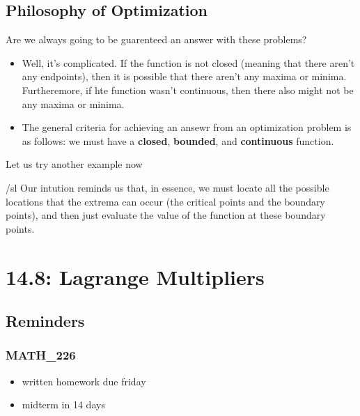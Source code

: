 \documentclass{report}
\begin{document}
\begin{sloppypar}
\begin{enumerate}
\end{enumerate}

\section{Philosophy of Optimization}
Are we always going to be guarenteed
an answer with these problems?
\begin{itemize}
  \item Well, it's complicated. If the function is
        not closed (meaning that there aren't
        any endpoints), then it is possible
        that there aren't any maxima or minima.
        Furtheremore, if hte function wasn't
        continuous, then there also might not
        be any maxima or minima.
  \item The general criteria for achieving
        an ansewr from an optimization problem
        is as follows: we must have a \textbf{closed},
        \textbf{bounded}, and \textbf{continuous} function.
\end{itemize}

Let us try another example now

/sl Our intution reminds us that, in essence,
we must locate all the possible locations that
the extrema can occur (the critical points and the
boundary points), and then just evaluate the value
of the function at these boundary points.

\chapter{14.8: Lagrange Multipliers}
\section{Reminders}
\subsection{MATH\_226}
\begin{itemize}
  \item written homework due friday
  \item midterm in 14 days



\end{itemize}
\end{sloppypar}
\end{document}
